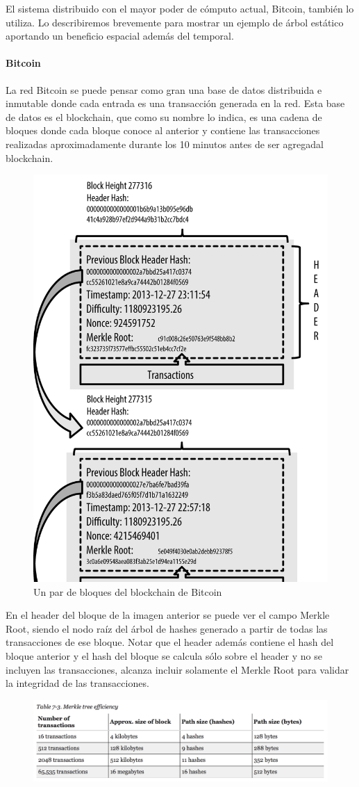 El sistema distribuido con el mayor poder de cómputo actual, Bitcoin, también lo utiliza. Lo describiremos brevemente para mostrar un ejemplo de árbol estático aportando un beneficio espacial además del temporal. 

\paragraph{Bitcoin}

La red Bitcoin se puede pensar como gran una base de datos distribuida e inmutable donde cada entrada es una transacción generada en la red. Esta base de datos es el blockchain, que como su nombre lo indica, es una cadena de bloques donde cada bloque conoce al anterior y contiene las transacciones realizadas aproximadamente durante los 10 minutos antes de ser agregadal blockchain. 

\begin{figure}[H]
\centering
  \includegraphics[width=.40\linewidth]{imagenes/blockchain.png}
  \caption{Un par de bloques del blockchain de Bitcoin}
\end{figure}

En el header del bloque de la imagen anterior se puede ver el campo Merkle Root, siendo el nodo raíz del árbol de hashes generado a partir de todas las transacciones de ese bloque. Notar que el header además contiene el hash del bloque anterior y el hash del bloque se calcula sólo sobre el header y no se incluyen las transacciones, alcanza incluir solamente el Merkle Root para validar la integridad de las transacciones.

\begin{figure}[H]
\centering
  \includegraphics[width=\linewidth]{imagenes/mt_efficiency.png}
\end{figure}

